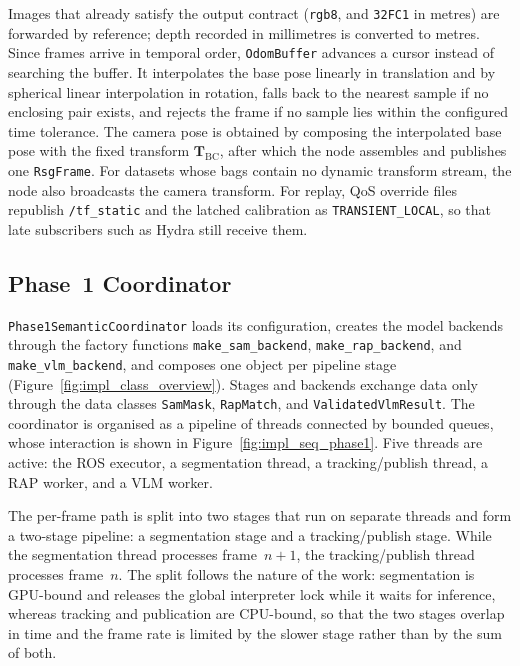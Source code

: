 {\small Images that already satisfy the output contract (\texttt{rgb8}, and \texttt{32FC1} in metres) are forwarded by reference; depth recorded in millimetres is converted to metres. Since frames arrive in temporal order, \texttt{OdomBuffer} advances a cursor instead of searching the buffer. It interpolates the base pose linearly in translation and by spherical linear interpolation in rotation, falls back to the nearest sample if no enclosing pair exists, and rejects the frame if no sample lies within the configured time tolerance. The camera pose is obtained by composing the interpolated base pose with the fixed transform $\mathbf{T}_{\mathrm{BC}}$, after which the node assembles and publishes one \texttt{RsgFrame}. For datasets whose bags contain no dynamic transform stream, the node also broadcasts the camera transform. For replay, QoS override files republish \texttt{/\allowbreak{}tf\_\allowbreak{}static} and the latched calibration as \texttt{TRANSIENT\_\allowbreak{}LOCAL}, so that late subscribers such as Hydra still receive them.\par}

\subsection{Phase~1 Coordinator}
\label{subsec:impl_phase1}
\label{subsec:impl_tracker}
\label{subsec:impl_labelling}

{\small \texttt{Phase1\allowbreak{}Semantic\allowbreak{}Coordinator} loads its configuration, creates the model backends through the factory functions \texttt{make\_\allowbreak{}sam\_\allowbreak{}backend}, \texttt{make\_\allowbreak{}rap\_\allowbreak{}backend}, and \texttt{make\_\allowbreak{}vlm\_\allowbreak{}backend}, and composes one object per pipeline stage (Figure~\ref{fig:impl_class_overview}). Stages and backends exchange data only through the data classes \texttt{SamMask}, \texttt{RapMatch}, and \texttt{ValidatedVlmResult}. The coordinator is organised as a pipeline of threads connected by bounded queues, whose interaction is shown in Figure~\ref{fig:impl_seq_phase1}. Five threads are active: the ROS executor, a segmentation thread, a tracking/publish thread, a RAP worker, and a VLM worker.\par}

{\small The per-frame path is split into two stages that run on separate threads and form a two-stage pipeline: a segmentation stage and a tracking/publish stage. While the segmentation thread processes frame~$n+1$, the tracking/publish thread processes frame~$n$. The split follows the nature of the work: segmentation is GPU-bound and releases the global interpreter lock while it waits for inference, whereas tracking and publication are CPU-bound, so that the two stages overlap in time and the frame rate is limited by the slower stage rather than by the sum of both.\par}

